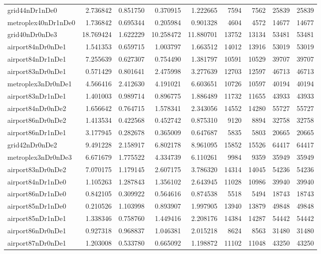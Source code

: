 \begin{longtable}{|l|r|r|r|r|r|r|r|r|}
grid44nDr1nDe0 & 2.736842 & 0.851750 & 0.370915 & 1.222665 & 7594 & 7562 & 25839 & 25839 \\
metroplex40nDr1nDe0 & 1.736842 & 0.695344 & 0.205984 & 0.901328 & 4604 & 4572 & 14677 & 14677 \\
grid40nDr0nDe3 & 18.769424 & 1.622229 & 10.258472 & 11.880701 & 13752 & 13134 & 53481 & 53481 \\
airport84nDr0nDe1 & 1.541353 & 0.659715 & 1.003797 & 1.663512 & 14012 & 13916 & 53019 & 53019 \\
airport84nDr1nDe1 & 7.255639 & 0.627307 & 0.754490 & 1.381797 & 10591 & 10529 & 39707 & 39707 \\
airport83nDr0nDe1 & 0.571429 & 0.801641 & 2.475998 & 3.277639 & 12703 & 12597 & 46713 & 46713 \\
metroplex3nDr0nDe1 & 4.566416 & 2.412630 & 4.191021 & 6.603651 & 10726 & 10597 & 40194 & 40194 \\
airport83nDr1nDe1 & 1.401003 & 0.989714 & 0.896775 & 1.886489 & 11732 & 11655 & 43933 & 43933 \\
airport84nDr0nDe2 & 1.656642 & 0.764715 & 1.578341 & 2.343056 & 14552 & 14280 & 55727 & 55727 \\
airport86nDr0nDe2 & 1.413534 & 0.422568 & 0.452742 & 0.875310 & 9120 & 8894 & 32758 & 32758 \\
airport86nDr1nDe1 & 3.177945 & 0.282678 & 0.365009 & 0.647687 & 5835 & 5803 & 20665 & 20665 \\
grid42nDr0nDe2 & 9.491228 & 2.158917 & 6.802178 & 8.961095 & 15852 & 15526 & 64417 & 64417 \\
metroplex3nDr0nDe3 & 6.671679 & 1.775522 & 4.334739 & 6.110261 & 9984 & 9359 & 35949 & 35949 \\
airport83nDr0nDe2 & 7.070175 & 1.179145 & 2.607175 & 3.786320 & 14314 & 14045 & 54236 & 54236 \\
airport84nDr1nDe0 & 1.105263 & 1.287843 & 1.356102 & 2.643945 & 11028 & 10986 & 39940 & 39940 \\
airport86nDr1nDe0 & 0.842105 & 0.309922 & 0.564616 & 0.874538 & 5518 & 5494 & 18743 & 18743 \\
airport85nDr1nDe0 & 0.210526 & 1.103998 & 0.893907 & 1.997905 & 13940 & 13879 & 49848 & 49848 \\
airport85nDr1nDe1 & 1.338346 & 0.758760 & 1.449416 & 2.208176 & 14384 & 14287 & 54442 & 54442 \\
airport86nDr0nDe1 & 0.927318 & 0.968837 & 1.046381 & 2.015218 & 8624 & 8563 & 31480 & 31480 \\
airport87nDr0nDe1 & 1.203008 & 0.533780 & 0.665092 & 1.198872 & 11102 & 11048 & 43250 & 43250 \\

\end{longtable}
